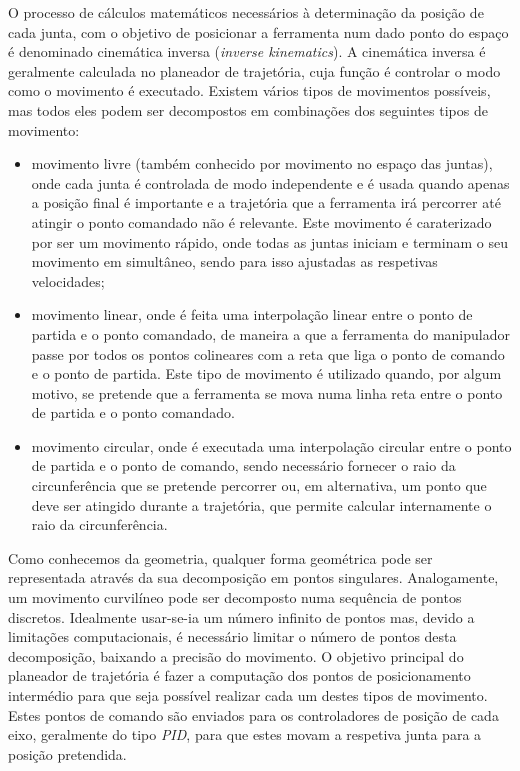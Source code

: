O processo de cálculos matemáticos necessários à determinação da posição
de cada junta, com o objetivo de posicionar a ferramenta num dado ponto
do espaço é denominado cinemática inversa  (\emph{inverse kinematics}).
A cinemática inversa é geralmente calculada no planeador de trajetória,
cuja função é controlar o modo como o movimento é executado. Existem vários
tipos de movimentos possíveis, mas todos eles podem ser decompostos em
combinações dos seguintes tipos de movimento:

\begin{itemize}
 \item movimento livre (também conhecido por movimento no espaço das
 juntas), onde cada junta é controlada de modo independente e é usada
 quando apenas a posição final é importante e a trajetória que a ferramenta
 irá percorrer até atingir o ponto comandado não é relevante. Este movimento
 é caraterizado por ser um movimento rápido, onde todas as juntas iniciam
 e terminam o seu movimento em simultâneo, sendo para isso ajustadas as
 respetivas velocidades;
 \item movimento linear, onde é feita uma interpolação linear entre o
 ponto de partida e o ponto comandado, de maneira a que a ferramenta do
 manipulador passe por todos os pontos colineares com a reta que liga
 o ponto de comando e o ponto de partida. Este tipo de movimento é utilizado
 quando, por algum motivo, se pretende que a ferramenta se mova numa linha
 reta entre o ponto de partida e o ponto comandado.
 \item movimento circular, onde é executada uma interpolação circular
 entre o ponto de partida e o ponto de comando, sendo necessário fornecer
 o raio da circunferência que se pretende percorrer ou, em alternativa,
 um ponto que deve ser atingido durante a trajetória, que permite calcular
 internamente o raio da circunferência.
\end{itemize}

Como conhecemos da geometria, qualquer forma geométrica pode ser representada
através da sua decomposição em pontos singulares. Analogamente, um movimento
curvilíneo pode ser decomposto numa sequência de pontos discretos.
Idealmente usar-se-ia um número infinito de pontos mas, devido a limitações
computacionais, é necessário limitar o número de pontos desta decomposição,
baixando a precisão do movimento. O objetivo principal do planeador de
trajetória é fazer a computação dos pontos de posicionamento intermédio
para que seja possível realizar cada um destes tipos de movimento.
Estes pontos de comando são enviados para os controladores de posição de
cada eixo, geralmente do tipo \emph{PID}, para que estes movam a respetiva junta
para a posição pretendida.

